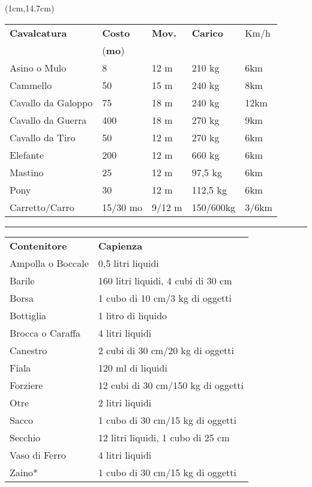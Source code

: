 \documentclass[a4paper,12 pt,openany]{book}
\newcommand{\riga}{\rule{\textwidth}{0.4pt}}
\begin{document}
\begin{textblock*}{12cm}(1cm,14.7cm) %

\begin{tabular}{lllll}
\hline
\textbf{Cavalcatura}&\textbf{Costo}&\textbf{Mov.}&\textbf{Carico}&Km/h\\
&(\textbf{mo})&&&\\
Asino o Mulo&8&12 m&210 kg&6km\\
Cammello&50&15 m&240 kg&8km\\
Cavallo da Galoppo&75&18 m&240 kg&12km\\
Cavallo da Guerra&400&18 m&270 kg&9km\\
Cavallo da Tiro&50&12 m&270 kg&6km\\
Elefante&200&12 m&660 kg&6km\\
Mastino&25&12 m&97,5 kg&6km\\
Pony&30&12 m&112,5 kg&6km\\
Carretto/Carro    & 15/30 mo & 9/12 m   &150/600kg    & 3/6km              \\
\end{tabular}

\riga

\begin{tabular}{ll}

\textbf{Contenitore}&\textbf{Capienza}\\
Ampolla o Boccale&0,5 litri liquidi\\
Barile&			160 litri liquidi, 4 cubi di 30 cm\\
Borsa&			1 cubo di 10 cm/3 kg di oggetti\\
Bottiglia&		1 litro di liquido\\
Brocca o Caraffa&4 litri liquidi\\
Canestro&		2 cubi di 30 cm/20 kg di oggetti\\
Fiala&			120 ml di liquidi\\
Forziere&		12 cubi di 30 cm/150 kg di oggetti\\
Otre&			2 litri liquidi\\
Sacco&			1 cubo di 30 cm/15 kg di oggetti\\
Secchio&		12 litri liquidi, 1 cubo di 25 cm\\
Vaso di Ferro&	4 litri liquidi\\
Zaino*&			1 cubo di 30 cm/15 kg di oggetti\\
\end{tabular}

\end{textblock*}
\end{document}
